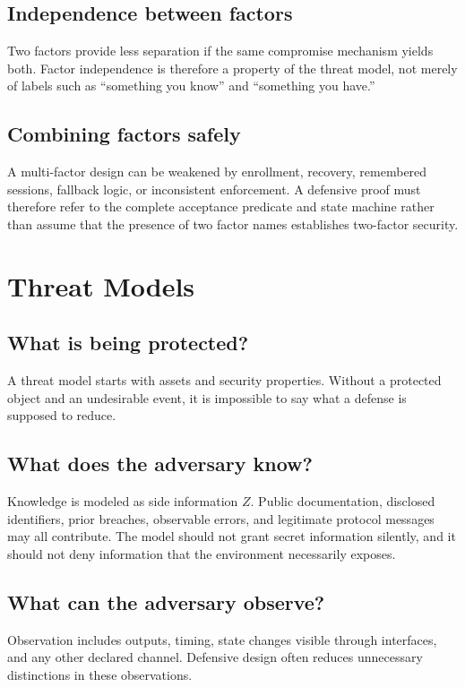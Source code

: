 \documentclass[11pt,oneside]{book}
\theoremstyle{definition}
\theoremstyle{remark}
\begin{document}
\section{Independence between factors}
Two factors provide less separation if the same compromise mechanism yields both. Factor independence is therefore a property of the threat model, not merely of labels such as ``something you know'' and ``something you have.''

\section{Combining factors safely}
A multi-factor design can be weakened by enrollment, recovery, remembered sessions, fallback logic, or inconsistent enforcement. A defensive proof must therefore refer to the complete acceptance predicate and state machine rather than assume that the presence of two factor names establishes two-factor security.

\chapter{Threat Models}
\label{ch:threat-models}
\section{What is being protected?}
A threat model starts with assets and security properties. Without a protected object and an undesirable event, it is impossible to say what a defense is supposed to reduce.

\section{What does the adversary know?}
Knowledge is modeled as side information $Z$. Public documentation, disclosed identifiers, prior breaches, observable errors, and legitimate protocol messages may all contribute. The model should not grant secret information silently, and it should not deny information that the environment necessarily exposes.

\section{What can the adversary observe?}
Observation includes outputs, timing, state changes visible through interfaces, and any other declared channel. Defensive design often reduces unnecessary distinctions in these observations.
\end{document}
